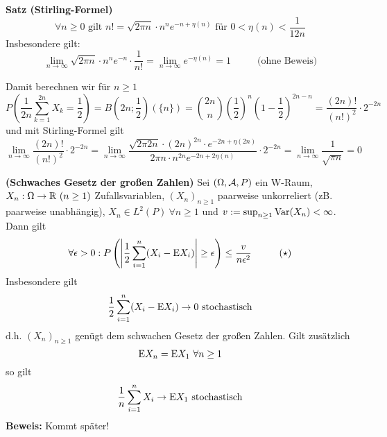 \documentclass[parskip = full, 12pt]{scrartcl}
\begin{document}
	\textbf{Satz (Stirling-Formel)}
	$$\forall n \geq 0 \textrm{ gilt } n! = \sqrt{2\pi n} \cdot 
	n^n e^{-n + \eta(n)} \textrm{ für }	0 < \eta(n) < \frac{1}{12n}$$
	Insbesondere gilt: 
	$$\lim_{n \rightarrow \infty} \sqrt{2\pi n} \cdot n^n e^{-n} \cdot 
	\frac{1}{n!} = \lim_{n \rightarrow \infty} e^{-\eta(n)} = 1 \hspace{1cm}
	\textrm{ (ohne Beweis)}$$ 

	Damit berechnen wir für $n \geq 1$
	$$ P\left( \frac{1}{2n} \sum_{k=1}^{2n} X_k = \frac{1}{2}\right) 
	=	B(2n; \frac{1}{2})(\{ n\}) 
	= \binom{2n}{n} {\left(\frac{1}{2}\right)}^n {\left(1- \frac{1}{2}\right)}
		^{2n-n}  
	= \frac{(2n)!}{(n!)^2} \cdot 2^{-2n}$$
	und mit Stirling-Formel gilt
	$$\lim_{n \rightarrow \infty} \frac{(2n)!}{(n!)^2} \cdot 2^{-2n} 
	= \lim_{n \rightarrow \infty} 
		\frac{ \sqrt{2\pi 2n} \cdot {(2n)}^{2n} \cdot e^{-2n + \eta(2n)} }
			{2\pi n \cdot n^{2n} e^{-2n + 2\eta(n)}}
		\cdot 2^{-2n}
	= \lim_{n \rightarrow \infty} \frac{1}{\sqrt{\pi n}} = 0	$$

\label{ss: Satz 7.9}
	\textbf{(Schwaches Gesetz der großen Zahlen)} Sei $(\Omega, \mathcal{A}, P)$ ein
	W-Raum, $X_n : \Omega \rightarrow \mathbb{R}\ (n \geq 1)$ Zufallsvariablen, ${(X_n)}_
	{n \geq 1}$	paarweise	unkorreliert (zB. paarweise unabhängig), $X_n \in L^2(P)
	\ \forall n \geq 1$	und $v := \sup_{n \geq 1} \textrm{Var}(X_n) < \infty$. Dann gilt
	$$ \forall \epsilon > 0: P\left( \left| \frac{1}{2} \sum_{i=1}^n (X_i 
		- \textrm{E} X_i ) \right| \geq \epsilon \right) \leq \frac{v}{n \epsilon^2} 
		\hspace{1cm} \textrm{($\star$)}$$
	Insbesondere gilt 
	$$\frac{1}{2} \sum_{i=1}^n (X_i	- \textrm{E} X_i) \rightarrow 0 \textrm{ stochastisch}
	$$
	d.h. ${(X_n)}_{n \geq 1}$ genügt dem schwachen Gesetz der großen Zahlen. Gilt
	zusätzlich 
	$$\textrm{E} X_n = \textrm{E} X_1\ \forall n \geq 1$$
	so gilt 
	$$\frac{1}{n} \sum_{i = 1}^n X_i \rightarrow \textrm{E} X_1 \textrm{ stochastisch}$$
	\textbf{Beweis:} Kommt später!
\end{document}

